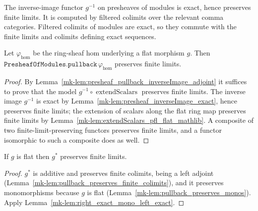 \begin{lemma}
  \label{mk-lem:presheaf_inverseImage_exact}
  The inverse-image functor \(g^{-1}\) on presheaves of modules is exact, hence
  preserves finite limits. It is computed by filtered colimits over the relevant comma
  categories. Filtered colimits of modules are exact, so they commute with the finite
  limits and colimits defining exact sequences.
\end{lemma}

\begin{lemma}
  \label{mk-lem:presheaf_pullback_pfl_flat}
  Let \(\varphi_{\mathrm{hom}}\) be the ring-sheaf hom underlying a flat morphism
  \(g\). Then \(\texttt{PresheafOfModules.pullback}\,\varphi_{\mathrm{hom}}\) preserves
  finite limits.
\end{lemma}

\begin{proof}
  By Lemma~\ref{mk-lem:presheaf_pullback_inverseImage_adjoint} it suffices to prove that
  the model \(g^{-1} \circ \operatorname{extendScalars}\) preserves finite limits. The
  inverse image \(g^{-1}\) is exact by
  Lemma~\ref{mk-lem:presheaf_inverseImage_exact}, hence preserves finite limits; the
  extension of scalars along the flat ring map preserves finite limits by
  Lemma~\ref{mk-lem:extendScalars_pfl_flat_mathlib}. A composite of two
  finite-limit-preserving functors preserves finite limits, and a functor isomorphic
  to such a composite does as well.
\end{proof}

\begin{lemma}
  \label{mk-lem:pullback_preserves_finite_limits}

  If \(g\) is flat then \(g^*\) preserves finite limits.
\end{lemma}

\begin{proof}
  \(g^*\) is additive and preserves finite colimits, being a left adjoint
  (Lemma~\ref{mk-lem:pullback_preserves_finite_colimits}), and it preserves monomorphisms because
  \(g\) is flat (Lemma~\ref{mk-lem:pullback_preserves_monos}). Apply
  Lemma~\ref{mk-lem:right_exact_mono_left_exact}.
\end{proof}

